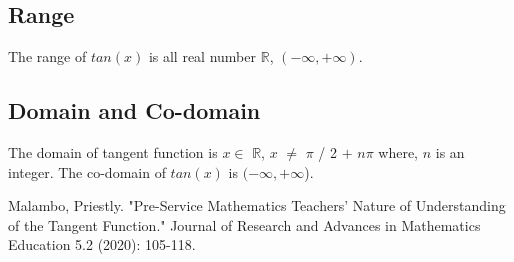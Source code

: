 \documentclass[a4paper, 11pt]{report}
\begin{document}
 \subsection*{Range}
 \normalsize{ The range of $tan(x)$ is all real number $\mathbb{R}$, $(- \infty, + \infty)$. }
 
 \subsection*{Domain and Co-domain}
 \normalsize{The domain of tangent function is $x \in$ $\mathbb{R}$, $x$ $\neq$ $\pi$ / 2 $+$ $n \pi$ where, $n$ is an integer. The co-domain of $tan(x)$ is \((-\infty, +\infty\)).}
 
 
 \begin{thebibliography}{}
 
Malambo, Priestly. "Pre-Service Mathematics Teachers' Nature of Understanding of the Tangent Function." Journal of Research and Advances in Mathematics Education 5.2 (2020): 105-118.


\end{thebibliography}
 
 
 
 
\pagebreak
\end{document}
